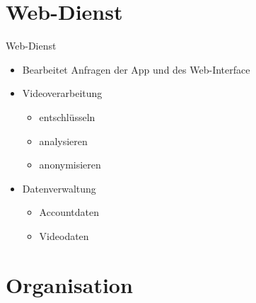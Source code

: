 \documentclass[19pt]{beamer}
\begin{document}
\section{Web-Dienst}
\begin{frame}{Web-Dienst}
	\begin{itemize}
		\item Bearbeitet Anfragen der App und des Web-Interface
		\pause
		\item Videoverarbeitung
			\begin{itemize}
				\item entschl\"usseln
				\item analysieren
				\item anonymisieren
			\end{itemize}
		\pause
		\item Datenverwaltung
			\begin{itemize}
				\item Accountdaten
				\item Videodaten
			\end{itemize}
	\end{itemize}
\end{frame}

\section{Organisation}
\end{document}
